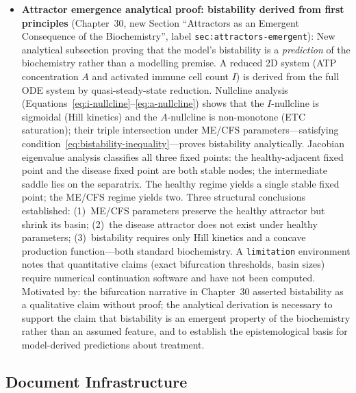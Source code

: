 \begin{itemize}
  \item \textbf{Attractor emergence analytical proof: bistability derived from first principles}
    (Chapter~30, new Section ``Attractors as an Emergent Consequence of the
    Biochemistry'', label \texttt{sec:attractors-emergent}):
    New analytical subsection proving that the model's bistability is a
    \emph{prediction} of the biochemistry rather than a modelling premise. A
    reduced 2D system (ATP concentration $A$ and activated immune cell count $I$)
    is derived from the full ODE system by quasi-steady-state reduction. Nullcline
    analysis (Equations~\ref{eq:i-nullcline}--\ref{eq:a-nullcline}) shows that the
    $I$-nullcline is sigmoidal (Hill kinetics) and the $A$-nullcline is non-monotone
    (ETC saturation); their triple intersection under ME/CFS parameters---satisfying
    condition~\ref{eq:bistability-inequality}---proves bistability analytically. Jacobian
    eigenvalue analysis classifies all three fixed points: the healthy-adjacent fixed
    point and the disease fixed point are both stable nodes; the intermediate saddle
    lies on the separatrix. The healthy regime yields a single stable fixed point;
    the ME/CFS regime yields two. Three structural conclusions established:
    (1)~ME/CFS parameters preserve the healthy attractor but shrink its basin;
    (2)~the disease attractor does not exist under healthy parameters;
    (3)~bistability requires only Hill kinetics and a concave production function---both
    standard biochemistry. A \texttt{limitation} environment notes that quantitative
    claims (exact bifurcation thresholds, basin sizes) require numerical continuation
    software and have not been computed.
    Motivated by: the bifurcation narrative in Chapter~30 asserted bistability as a
    qualitative claim without proof; the analytical derivation is necessary to support
    the claim that bistability is an emergent property of the biochemistry rather than
    an assumed feature, and to establish the epistemological basis for model-derived
    predictions about treatment.

\end{itemize}

\subsection*{Document Infrastructure}

